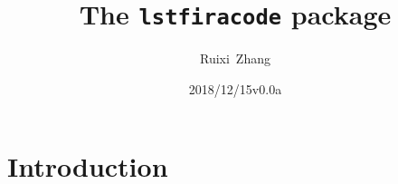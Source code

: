 \documentclass{article}
\title{The \texttt{lstfiracode} package}
\author{Ruixi~Zhang}
\date{2018/12/15\enskip v0.0a}
\begin{document}
\maketitle

\section{Introduction}
\end{document}
